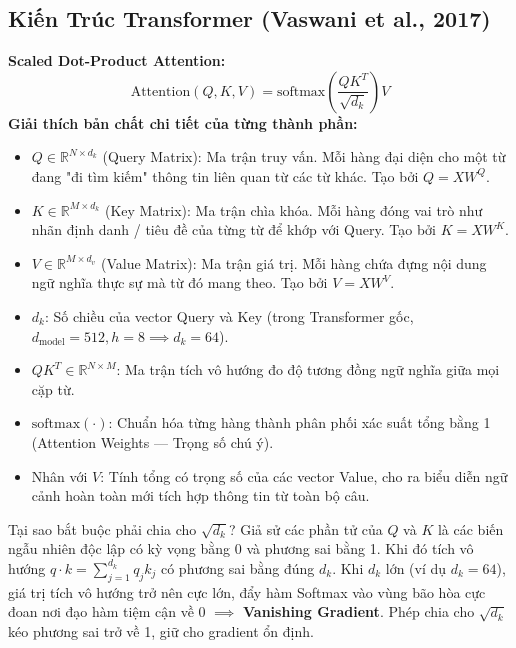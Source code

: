 \documentclass[10pt,a4paper]{article}
\begin{document}
\subsection{Kiến Trúc Transformer (Vaswani et al., 2017)}
\textbf{Scaled Dot-Product Attention:}
\begin{equation}
    \text{Attention}(Q, K, V) = \text{softmax}\left( \frac{QK^T}{\sqrt{d_k}} \right) V
\end{equation}
\textbf{Giải thích bản chất chi tiết của từng thành phần:}
\begin{itemize}[leftmargin=*]
    \item $Q \in \mathbb{R}^{N \times d_k}$ (Query Matrix): Ma trận truy vấn. Mỗi hàng đại diện cho một từ đang "đi tìm kiếm" thông tin liên quan từ các từ khác. Tạo bởi $Q = X W^Q$.
    \item $K \in \mathbb{R}^{M \times d_k}$ (Key Matrix): Ma trận chìa khóa. Mỗi hàng đóng vai trò như nhãn định danh / tiêu đề của từng từ để khớp với Query. Tạo bởi $K = X W^K$.
    \item $V \in \mathbb{R}^{M \times d_v}$ (Value Matrix): Ma trận giá trị. Mỗi hàng chứa đựng nội dung ngữ nghĩa thực sự mà từ đó mang theo. Tạo bởi $V = X W^V$.
    \item $d_k$: Số chiều của vector Query và Key (trong Transformer gốc, $d_{\text{model}} = 512, h = 8 \implies d_k = 64$).
    \item $QK^T \in \mathbb{R}^{N \times M}$: Ma trận tích vô hướng đo độ tương đồng ngữ nghĩa giữa mọi cặp từ.
    \item $\text{softmax}(\cdot)$: Chuẩn hóa từng hàng thành phân phối xác suất tổng bằng 1 (Attention Weights --- Trọng số chú ý).
    \item Nhân với $V$: Tính tổng có trọng số của các vector Value, cho ra biểu diễn ngữ cảnh hoàn toàn mới tích hợp thông tin từ toàn bộ câu.
\end{itemize}

\begin{trapbox}{Tại sao bắt buộc phải chia cho $\sqrt{d_k}$?}
Giả sử các phần tử của $Q$ và $K$ là các biến ngẫu nhiên độc lập có kỳ vọng bằng 0 và phương sai bằng 1. Khi đó tích vô hướng $q \cdot k = \sum_{j=1}^{d_k} q_j k_j$ có phương sai bằng đúng $d_k$. Khi $d_k$ lớn (ví dụ $d_k = 64$), giá trị tích vô hướng trở nên cực lớn, đẩy hàm Softmax vào vùng bão hòa cực đoan nơi đạo hàm tiệm cận về 0 $\implies$ \textbf{Vanishing Gradient}. Phép chia cho $\sqrt{d_k}$ kéo phương sai trở về 1, giữ cho gradient ổn định.
\end{trapbox}
\end{document}
